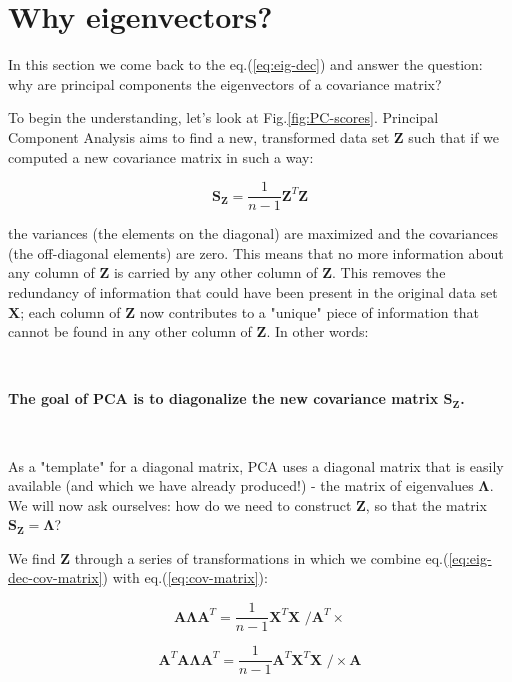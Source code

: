 \documentclass[10pt,twocolumn]{article}
\begin{document}
\section{Why eigenvectors?}

In this section we come back to the eq.(\ref{eq:eig-dec}) and answer the question: why are principal components the eigenvectors of a covariance matrix? 

To begin the understanding, let's look at Fig.\ref{fig:PC-scores}. Principal Component Analysis aims to find a new, transformed data set $\bm{Z}$ such that if we computed a new covariance matrix in such a way:

\begin{equation}
\bm{S_Z} =  \frac{1}{n-1} \bm{Z}^T \bm{Z}
\end{equation}

the variances (the elements on the diagonal) are maximized and the covariances (the off-diagonal elements) are zero. This means that no more information about any column of $\bm{Z}$ is carried by any other column of $\bm{Z}$. This removes the redundancy of information that could have been present in the original data set $\bm{X}$; each column of $\bm{Z}$ now contributes to a "unique" piece of information that cannot be found in any other column of $\bm{Z}$. In other words:

\,\,

\textbf{The goal of PCA is to diagonalize the new covariance matrix $\bm{S_Z}$.}

\,\,

As a "template" for a diagonal matrix, PCA uses a diagonal matrix that is easily available (and which we have already produced!) - the matrix of eigenvalues $\bm{\Lambda}$. We will now ask ourselves: how do we need to construct $\bm{Z}$, so that the matrix $\bm{S_Z} = \bm{\Lambda}$?

We find $\bm{Z}$ through a series of transformations in which we combine eq.(\ref{eq:eig-dec-cov-matrix}) with eq.(\ref{eq:cov-matrix}):

\begin{equation}
\bm{A} \bm{\Lambda} \bm{A}^T =  \frac{1}{n-1} \bm{X}^T \bm{X} \,\, \Big/ \bm{A}^T \times
\end{equation}

\begin{equation}
\bm{A}^T \bm{A} \bm{\Lambda} \bm{A}^T =  \frac{1}{n-1} \bm{A}^T  \bm{X}^T \bm{X} \,\, \Big/ \times \bm{A}
\end{equation}
\end{document}
